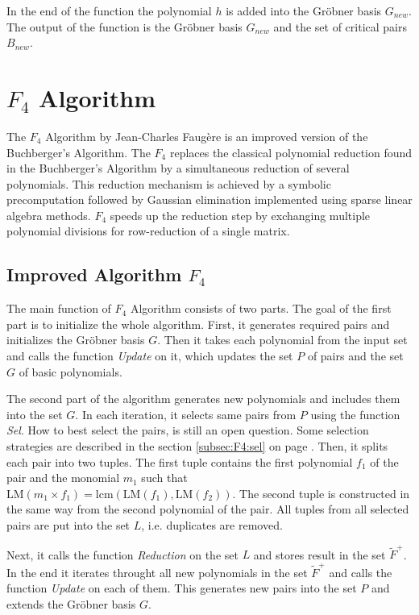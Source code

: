 In the end of the function the polynomial $h$ is added into the Gr\"obner basis $G_{new}$. The output of the function is the Gr\"obner basis $G_{new}$ and the set of critical pairs $B_{new}$.



\section{$F_4$ Algorithm}
The $F_4$ Algorithm \cite{F4} by Jean-Charles Faug\`ere is an improved version of the Buchberger's Algorithm. The $F_4$ replaces the classical polynomial reduction found in the Buchberger's Algorithm by a simultaneous reduction of several polynomials. This reduction mechanism is achieved by a symbolic precomputation followed by Gaussian elimination implemented using sparse linear algebra methods. $F_4$ speeds up the reduction step by exchanging multiple polynomial divisions for row-reduction of a single matrix.

\subsection{Improved Algorithm $F_4$}
The main function of $F_4$ Algorithm consists of two parts. The goal of the first part is to initialize the whole algorithm. First, it generates required pairs and initializes the Gr\"obner basis $G$. Then it takes each polynomial from the input set and calls the function \textit{Update} on it, which updates the set $P$ of pairs and the set $G$ of basic polynomials.

The second part of the algorithm generates new polynomials and includes them into the set $G$. In each iteration, it selects same pairs from $P$ using the function \textit{Sel}. How to best select the pairs, is still an open question. Some selection strategies are described in the section \ref{subsec:F4:sel} on page \pageref{subsec:F4:sel}. Then, it splits each pair into two tuples. The first tuple contains the first polynomial $f_1$ of the pair and the monomial $m_1$ such that $\textrm{LM}(m_1 \times f_1) = \textrm{lcm}(\textrm{LM}(f_1),\textrm{LM}(f_2))$. The second tuple is constructed in the same way from the second polynomial of the pair. All tuples from all selected pairs are put into the set $L$, i.e. duplicates are removed.

Next, it calls the function \textit{Reduction} on the set $L$ and stores result in the set $\tilde{F}^+$. In the end it iterates throught all new polynomials in the set $\tilde{F}^+$ and calls the function \textit{Update} on each of them. This generates new pairs into the set $P$ and extends the Gr\"obner basis $G$.

